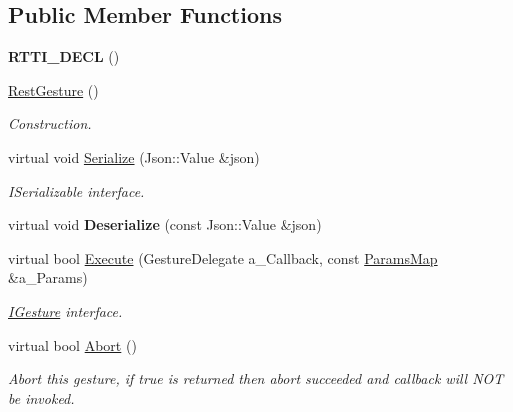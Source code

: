 \subsection*{Public Member Functions}
\begin{DoxyCompactItemize}
\item 
\mbox{\label{class_rest_gesture_a1e0f78d88310995e5bd635789609b9fe}} 
{\bfseries R\+T\+T\+I\+\_\+\+D\+E\+CL} ()
\item 
\mbox{\label{class_rest_gesture_a9fd1eb4ce8c6fe33dd9de988d50c6287}} 
\hyperlink{class_rest_gesture_a9fd1eb4ce8c6fe33dd9de988d50c6287}{Rest\+Gesture} ()
\begin{DoxyCompactList}\small\item\em Construction. \end{DoxyCompactList}\item 
\mbox{\label{class_rest_gesture_ab9bfe8aa81bb486d803a8b7284f8e352}} 
virtual void \hyperlink{class_rest_gesture_ab9bfe8aa81bb486d803a8b7284f8e352}{Serialize} (Json\+::\+Value \&json)
\begin{DoxyCompactList}\small\item\em I\+Serializable interface. \end{DoxyCompactList}\item 
\mbox{\label{class_rest_gesture_a5512d7d48510080437127b20cf9288b1}} 
virtual void {\bfseries Deserialize} (const Json\+::\+Value \&json)
\item 
\mbox{\label{class_rest_gesture_a84673c22b5a8d5c30b946149b4884d6c}} 
virtual bool \hyperlink{class_rest_gesture_a84673c22b5a8d5c30b946149b4884d6c}{Execute} (Gesture\+Delegate a\+\_\+\+Callback, const \hyperlink{class_params_map}{Params\+Map} \&a\+\_\+\+Params)
\begin{DoxyCompactList}\small\item\em \hyperlink{class_i_gesture}{I\+Gesture} interface. \end{DoxyCompactList}\item 
\mbox{\label{class_rest_gesture_a7100d55765846c97c9e508842e4e0be1}} 
virtual bool \hyperlink{class_rest_gesture_a7100d55765846c97c9e508842e4e0be1}{Abort} ()
\begin{DoxyCompactList}\small\item\em Abort this gesture, if true is returned then abort succeeded and callback will N\+OT be invoked. \end{DoxyCompactList}\item 

\end{DoxyCompactItemize}
